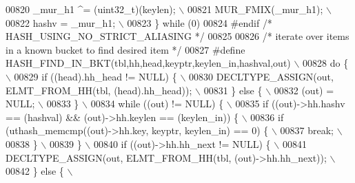 \begin{DoxyCode}
{{{{{{{{00820 \textcolor{preprocessor}{  \_mur\_h1 ^= (uint32\_t)(keylen);                                       \(\backslash\)}
00821 \textcolor{preprocessor}{  MUR\_FMIX(\_mur\_h1);                                                   \(\backslash\)}
00822 \textcolor{preprocessor}{  hashv = \_mur\_h1;                                                     \(\backslash\)}
00823 \textcolor{preprocessor}{\} while (0)}
00824 \textcolor{preprocessor}{#endif  }\textcolor{comment}{/* HASH\_USING\_NO\_STRICT\_ALIASING */}\textcolor{preprocessor}{}
00825 
00826 \textcolor{comment}{/* iterate over items in a known bucket to find desired item */}
00827 \textcolor{preprocessor}{#define HASH\_FIND\_IN\_BKT(tbl,hh,head,keyptr,keylen\_in,hashval,out)               \(\backslash\)}
00828 \textcolor{preprocessor}{do \{                                                                             \(\backslash\)}
00829 \textcolor{preprocessor}{  if ((head).hh\_head != NULL) \{                                                  \(\backslash\)}
00830 \textcolor{preprocessor}{    DECLTYPE\_ASSIGN(out, ELMT\_FROM\_HH(tbl, (head).hh\_head));                     \(\backslash\)}
00831 \textcolor{preprocessor}{  \} else \{                                                                       \(\backslash\)}
00832 \textcolor{preprocessor}{    (out) = NULL;                                                                \(\backslash\)}
00833 \textcolor{preprocessor}{  \}                                                                              \(\backslash\)}
00834 \textcolor{preprocessor}{  while ((out) != NULL) \{                                                        \(\backslash\)}
00835 \textcolor{preprocessor}{    if ((out)->hh.hashv == (hashval) && (out)->hh.keylen == (keylen\_in)) \{       \(\backslash\)}
00836 \textcolor{preprocessor}{      if (uthash\_memcmp((out)->hh.key, keyptr, keylen\_in) == 0) \{                \(\backslash\)}
00837 \textcolor{preprocessor}{        break;                                                                   \(\backslash\)}
00838 \textcolor{preprocessor}{      \}                                                                          \(\backslash\)}
00839 \textcolor{preprocessor}{    \}                                                                            \(\backslash\)}
00840 \textcolor{preprocessor}{    if ((out)->hh.hh\_next != NULL) \{                                             \(\backslash\)}
00841 \textcolor{preprocessor}{      DECLTYPE\_ASSIGN(out, ELMT\_FROM\_HH(tbl, (out)->hh.hh\_next));                \(\backslash\)}
00842 \textcolor{preprocessor}{    \} else \{                                                                     \(\backslash\)}
}}}}}}}}
\end{DoxyCode}
